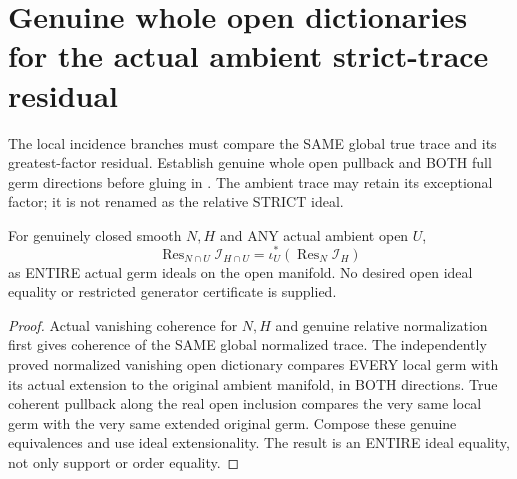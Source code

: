 \section{Genuine whole open dictionaries for the actual ambient strict-trace residual}

The local incidence branches must compare the SAME global true trace and
its greatest-factor residual. Establish genuine whole open pullback and
BOTH full germ directions before gluing in
\cite[Remark~12.6, pp.~293--295]{bierstone-milman97-invent-math}.
The ambient trace may retain its exceptional factor; it is not renamed
as the relative STRICT ideal.

\begin{lemma}
\label{hir:sharp-actual-normalized-trace-whole-open-pullback}
\leanok
For genuinely closed smooth $N,H$ and ANY actual ambient open $U$,
\[
 \operatorname{Res}_{N\cap U}\mathcal I_{H\cap U}
 =\iota_U^*(\operatorname{Res}_N\mathcal I_H)
\]
as ENTIRE actual germ ideals on the open manifold. No desired open ideal
equality or restricted generator certificate is supplied.
\end{lemma}
\begin{proof}
Actual vanishing coherence for $N,H$ and genuine relative normalization
first gives coherence of the SAME global normalized trace. The independently
proved normalized vanishing open dictionary compares EVERY local germ
with its actual extension to the original ambient manifold, in BOTH
directions. True coherent pullback along the real open inclusion compares
the very same local germ with the very same extended original germ.
Compose these genuine equivalences and use ideal extensionality. The
result is an ENTIRE ideal equality, not only support or order equality.
\end{proof}

